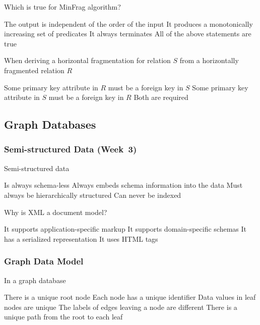\documentclass[12pt,a4paper]{exam} %
\begin{document}
\begin{flushleft}
\begin{multicols*}{2}
\begin{questions}
\question Which is true for MinFrag algorithm?
\begin{checkboxes}
\choice The output is independent of the order of the input
\choice It produces a monotonically increasing set of predicates
\CorrectChoice It always terminates
\choice All of the above statements are true
\end{checkboxes}


\question When deriving a horizontal fragmentation for relation $S$ from a horizontally fragmented relation $R$
\begin{checkboxes}
\CorrectChoice Some primary key attribute in $R$ must be a foreign key in $S$
\choice Some primary key attribute in $S$ must be a foreign key in $R$
\choice Both are required
\end{checkboxes}



\subsection{Graph Databases} %
\subsubsection{Semi-structured Data (Week~3)}

\question Semi-structured data
\begin{checkboxes}
\choice Is always schema-less
\CorrectChoice Always embeds schema information into the data
\choice Must always be hierarchically structured
\choice Can never be indexed
\end{checkboxes}

\question Why is XML a document model?
\begin{checkboxes}
\choice It supports application-specific markup
\choice It supports domain-specific schemas
\CorrectChoice It has a serialized representation
\choice It uses HTML tags
\end{checkboxes}


\subsubsection{Graph Data Model}

\question In a graph database
\begin{checkboxes}
\choice There is a unique root node
\CorrectChoice Each node has a unique identifier
\choice Data values in leaf nodes are unique
\choice The labels of edges leaving a node are different
\choice There is a unique path from the root to each leaf
\end{checkboxes}


\end{questions}
\end{multicols*}
\end{flushleft}
\end{document}
